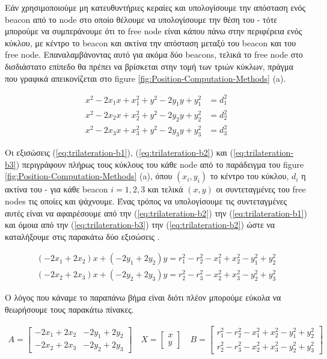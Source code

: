 Εάν χρησιμοποιούμε μη κατευθυντήριες κεραίες και υπολογίσουμε την απόσταση ενός beacon από το node στο οποίο θέλουμε να υπολογίσουμε την θέση του -
τότε μπορούμε να συμπεράνουμε ότι το free node είναι κάπου πάνω στην περιφέρεια ενός 
κύκλου, με κέντρο το beacon και ακτίνα την απόσταση μεταξύ του beacon και του free node. 
Επαναλαμβάνοντας αυτό για ακόμα δύο beacons, τελικά το free node στο δισδιάστατο επίπεδο θα πρέπει να βρίσκεται στην τομή των τριών κύκλων, πράγμα που γραφικά 
απεικονίζεται στο figure \ref{fig:Position-Computation-Methods} (a).

\begin{align}
	x^2-2 x_1 x + x_1^2 + y^2-2 y_1 y + y_1^2 &= d_1^2 \label{eq:trilateration-b1} \\ 
	x^2-2 x_2 x + x_2^2 + y^2-2 y_2 y + y_2^2 &= d_2^2 \label{eq:trilateration-b2} \\
	x^2-2 x_3 x + x_3^2 + y^2-2 y_3 y + y_3^2 &= d_3^2 \label{eq:trilateration-b3} 
\end{align}

Οι εξισώσεις (\ref{eq:trilateration-b1}), (\ref{eq:trilateration-b2}) και (\ref{eq:trilateration-b3}) περιγράφουν πλήρως τους κύκλους του κάθε node από το παράδειγμα 
του figure \ref{fig:Position-Computation-Methods} (a),
όπου $(x_i,y_i)$ το κέντρο του κύκλου, $d_i$ η ακτίνα του - για κάθε beacon $i=1,2,3$ και τελικά $(x,y)$ οι συντεταγμένες του free nodes τις οποίες και ψάχνουμε. 
Ένας τρόπος να υπολογίσουμε τις συντεταγμένες αυτές είναι να αφαιρέσουμε από την (\ref{eq:trilateration-b2}) την (\ref{eq:trilateration-b1}) και όμοια από την 
(\ref{eq:trilateration-b3}) την (\ref{eq:trilateration-b2}) ώστε να καταλήξουμε στις παρακάτω δύο εξισώσεις \cite{trilateration-equations}.

\begin{align}
	(-2x_1+2x_2)x + (-2y_1+2y_2)y = r_1^2 - r_2^2 - x_1^2 + x_2^2 - y_1^2 + y_2^2  \nonumber \\
	(-2x_2+2x_3)x + (-2y_2+2y_3)y = r_2^2 - r_3^2 - x_2^2 + x_3^2 - y_2^2 + y_3^2  \nonumber
\end{align}

Ο λόγος που κάναμε το παραπάνω βήμα είναι διότι πλέον μπορούμε εύκολα να θεωρήσουμε τους παρακάτω πίνακες.

\begin{align}
	A = \begin{bmatrix} -2x_1+2x_2 & -2y_1+2y_2 \\ -2x_2+2x_3 & -2y_2+2y_3 \end{bmatrix} \nonumber \quad
	X = \begin{bmatrix} x \\ y \end{bmatrix} \nonumber \quad
	B = \begin{bmatrix} r_1^2 - r_2^2 - x_1^2 + x_2^2 - y_1^2 + y_2^2 \\ r_2^2 - r_3^2 - x_2^2 + x_3^2 - y_2^2 + y_3^2 \end{bmatrix} \nonumber
\end{align}

